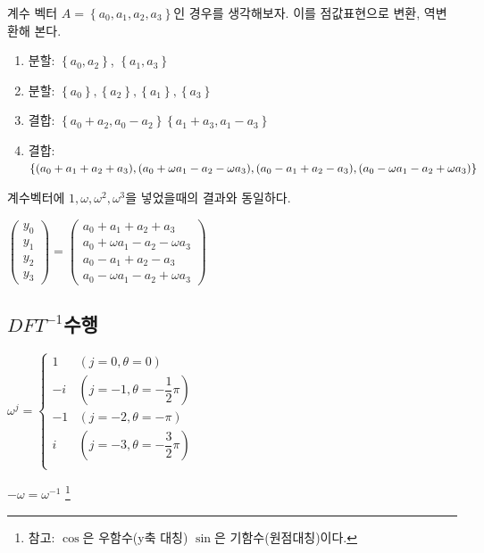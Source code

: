 \documentclass{oblivoir}
\begin{document}
계수 벡터 $A = \left\{a_0, a_1, a_2, a_3 \right\}$인 경우를 생각해보자. 이를 점값표현으로 변환, 역변환해 본다.

\begin{enumerate}
    \item 분할: $\left\{a_0, a_2 \right\}$, $\left\{a_1, a_3\right\}$
    \item 분할: $\left\{a_0\right\}, \left\{a_2\right\}, \left\{a_1\right\}, \left\{a_3\right\}$
    \item 결합: $\left\{a_0 + a_2, a_0 - a_2 \right\}\left\{a_1 + a_3, a_1 - a_3\right\}$
    \item 결합: $\left\{(a_0 + a_1 + a_2 + a_3), (a_0 + \omega a_1 - a_2 -\omega a_3) , \\(a_0 - a_1 + a_2 - a_3), (a_0 - \omega a_1 - a_2 + \omega a_3) \right\}$
\end{enumerate}

계수벡터에 $1, \omega ,\omega^2 , \omega^3 $을 넣었을때의 결과와 동일하다.

$
\begin{pmatrix}
    y_0 \\ 
    y_1 \\
    y_2 \\
    y_3 
\end{pmatrix}
=
\begin{pmatrix}
    a_0 + a_1 + a_2 + a_3 \\ 
    a_0 + \omega a_1 - a_2 -\omega a_3 \\
    a_0 - a_1 + a_2 - a_3 \\
    a_0 - \omega a_1 - a_2 + \omega a_3
\end{pmatrix}
$


\subsection{$DFT^{-1}$수행}

$
\omega^j = \left\{
\begin{array}{rl}
    1 & ( j = 0, \theta = 0 ) \\
    -i & ( j = -1, \theta = -\dfrac{1}{2}\pi) \\
    -1 & ( j = -2, \theta = -\pi ) \\
    i & ( j = -3, \theta = -\dfrac{3}{2}\pi ) \\
\end{array}
\right.
$


$-\omega = \omega^{-1}$
\footnote{참고: $\cos$은 우함수(y축 대칭) $\sin$은 기함수(원점대칭)이다. }
\end{document}
